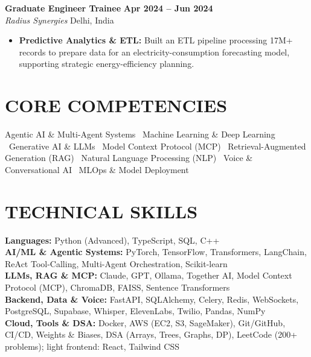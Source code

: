 \documentclass[10pt,a4paper]{article}
\begin{document}
\textbf{Graduate Engineer Trainee} \hfill \textbf{Apr 2024 -- Jun 2024} \\
\textit{Radius Synergies} \hfill Delhi, India \\
\begin{itemize}[leftmargin=*,noitemsep,topsep=0pt,partopsep=0pt]
    \item \textbf{Predictive Analytics \& ETL:} Built an ETL pipeline processing 17M+ records to prepare data for an electricity-consumption forecasting model, supporting strategic energy-efficiency planning.
\end{itemize}

\vspace{4pt}

\section{CORE COMPETENCIES}

Agentic AI \& Multi-Agent Systems \textbullet\ Machine Learning \& Deep Learning \textbullet\ Generative AI \& LLMs \textbullet\ Model Context Protocol (MCP) \textbullet\ Retrieval-Augmented Generation (RAG) \textbullet\ Natural Language Processing (NLP) \textbullet\ Voice \& Conversational AI \textbullet\ MLOps \& Model Deployment

\vspace{4pt}

\section{TECHNICAL SKILLS}

\textbf{Languages:} Python (Advanced), TypeScript, SQL, C++ \\
\textbf{AI/ML \& Agentic Systems:} PyTorch, TensorFlow, Transformers, LangChain, ReAct Tool-Calling, Multi-Agent Orchestration, Scikit-learn \\
\textbf{LLMs, RAG \& MCP:} Claude, GPT, Ollama, Together AI, Model Context Protocol (MCP), ChromaDB, FAISS, Sentence Transformers \\
\textbf{Backend, Data \& Voice:} FastAPI, SQLAlchemy, Celery, Redis, WebSockets, PostgreSQL, Supabase, Whisper, ElevenLabs, Twilio, Pandas, NumPy \\
\textbf{Cloud, Tools \& DSA:} Docker, AWS (EC2, S3, SageMaker), Git/GitHub, CI/CD, Weights \& Biases, DSA (Arrays, Trees, Graphs, DP), LeetCode (200+ problems); light frontend: React, Tailwind CSS
\end{document}
